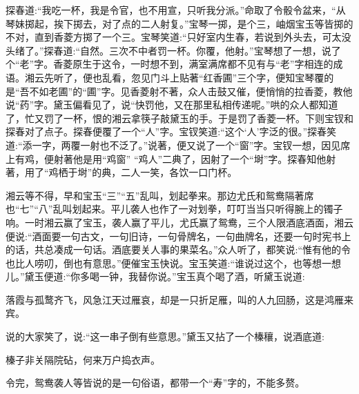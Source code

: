 \begin{parag}
    探春道:“我吃一杯，我是令官，也不用宣，只听我分派。”命取了令骰令盆来，“从琴妹掷起，挨下掷去，对了点的二人射复。”宝琴一掷，是个三，岫烟宝玉等皆掷的不对，直到香菱方掷了一个三。宝琴笑道:“只好室内生春，若说到外头去，可太没头绪了。”探春道:“自然。三次不中者罚一杯。你覆，他射。”宝琴想了一想，说了个“老”字。香菱原生于这令，一时想不到，满室满席都不见有与“老”字相连的成语。湘云先听了，便也乱看，忽见门斗上贴著“红香圃”三个字，便知宝琴覆的是“吾不如老圃”的“圃”字。见香菱射不著，众人击鼓又催，便悄悄的拉香菱，教他说“药”字。黛玉偏看见了，说“快罚他，又在那里私相传递呢。”哄的众人都知道了，忙又罚了一杯，恨的湘云拿筷子敲黛玉的手。于是罚了香菱一杯。下则宝钗和探春对了点子。探春便覆了一个“人”字。宝钗笑道:“这个‘人’字泛的很。”探春笑道:“添一字，两覆一射也不泛了。”说著，便又说了一个“窗”字。宝钗一想，因见席上有鸡，便射著他是用“鸡窗” “鸡人”二典了，因射了一个“埘”字。探春知他射著，用了“鸡栖于埘”的典，二人一笑，各饮一口门杯。
\end{parag}


\begin{parag}
    湘云等不得，早和宝玉“三”“五”乱叫，划起拳来。那边尤氏和鸳鸯隔著席也“七”“八”乱叫划起来。平儿袭人也作了一对划拳，叮叮当当只听得腕上的镯子响。一时湘云赢了宝玉，袭人赢了平儿，尤氏赢了鸳鸯，三个人限酒底酒面，湘云便说:“酒面要一句古文，一句旧诗，一句骨牌名，一句曲牌名，还要一句时宪书上的话，共总凑成一句话。酒底要关人事的果菜名。”众人听了，都笑说:“惟有他的令也比人唠叨，倒也有意思。”便催宝玉快说。宝玉笑道:“谁说过这个，也等想一想儿。”黛玉便道:“你多喝一钟，我替你说。”宝玉真个喝了酒，听黛玉说道:
\end{parag}


\begin{poem}
    \begin{pl}落霞与孤鹜齐飞，风急江天过雁哀，却是一只折足雁，叫的人九回肠，这是鸿雁来宾。\end{pl}
\end{poem}


\begin{parag}
    说的大家笑了，说:“这一串子倒有些意思。”黛玉又拈了一个榛穰，说酒底道:
\end{parag}


\begin{poem}
    \begin{pl}榛子非关隔院砧，何来万户捣衣声。\end{pl}
\end{poem}


\begin{parag}
    令完，鸳鸯袭人等皆说的是一句俗语，都带一个“寿”字的，不能多赘。
\end{parag}


